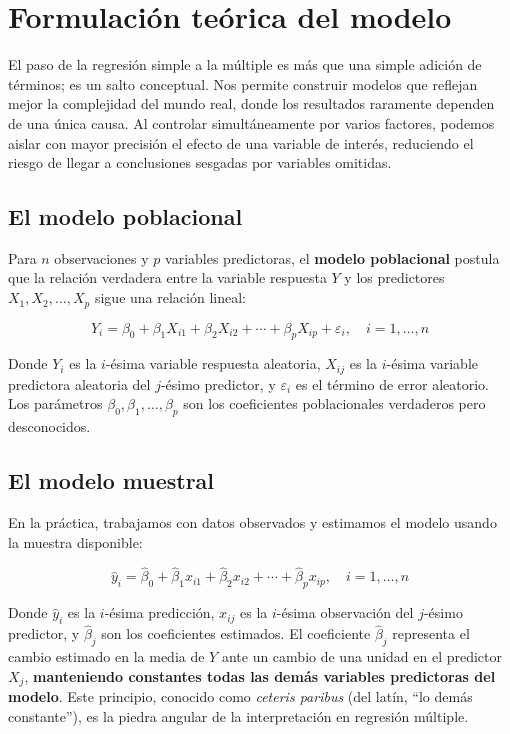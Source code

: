 \documentclass[
  letterpaper,
  DIV=11,
  numbers=noendperiod]{scrreprt}
\begin{document}
\section{Formulación teórica del
modelo}\label{formulaciuxf3n-teuxf3rica-del-modelo-1}

El paso de la regresión simple a la múltiple es más que una simple
adición de términos; es un salto conceptual. Nos permite construir
modelos que reflejan mejor la complejidad del mundo real, donde los
resultados raramente dependen de una única causa. Al controlar
simultáneamente por varios factores, podemos aislar con mayor precisión
el efecto de una variable de interés, reduciendo el riesgo de llegar a
conclusiones sesgadas por variables omitidas.

\subsection{El modelo poblacional}\label{el-modelo-poblacional}

Para \(n\) observaciones y \(p\) variables predictoras, el
\textbf{modelo poblacional} postula que la relación verdadera entre la
variable respuesta \(Y\) y los predictores \(X_1, X_2, \ldots, X_p\)
sigue una relación lineal:

\[Y_i = \beta_0 + \beta_1 X_{i1} + \beta_2 X_{i2} + \cdots + \beta_p X_{ip} + \varepsilon_i, \quad i = 1,\dots,n\]

Donde \(Y_i\) es la \(i\)-ésima variable respuesta aleatoria, \(X_{ij}\)
es la \(i\)-ésima variable predictora aleatoria del \(j\)-ésimo
predictor, y \(\varepsilon_i\) es el término de error aleatorio. Los
parámetros \(\beta_0, \beta_1, \ldots, \beta_p\) son los coeficientes
poblacionales verdaderos pero desconocidos.

\subsection{El modelo muestral}\label{el-modelo-muestral}

En la práctica, trabajamos con datos observados y estimamos el modelo
usando la muestra disponible:

\[\hat{y}_i = \hat{\beta}_0 + \hat{\beta}_1 x_{i1} + \hat{\beta}_2 x_{i2} + \cdots + \hat{\beta}_p x_{ip}, \quad i = 1,\dots,n\]

Donde \(\hat{y}_i\) es la \(i\)-ésima predicción, \(x_{ij}\) es la
\(i\)-ésima observación del \(j\)-ésimo predictor, y \(\hat{\beta}_j\)
son los coeficientes estimados. El coeficiente \(\hat{\beta}_j\)
representa el cambio estimado en la media de \(Y\) ante un cambio de una
unidad en el predictor \(X_j\), \textbf{manteniendo constantes todas las
demás variables predictoras del modelo}. Este principio, conocido como
\emph{ceteris paribus} (del latín, ``lo demás constante''), es la piedra
angular de la interpretación en regresión múltiple.
\end{document}
